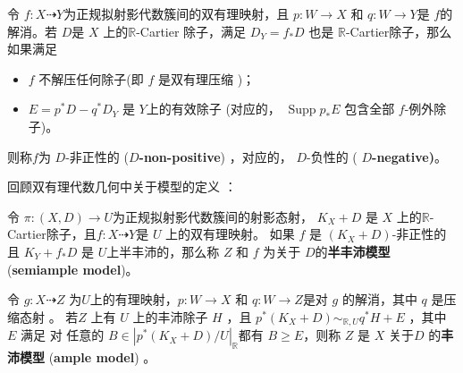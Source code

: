\begin{definition}\label{negativemap}
  \cite[Definition 3.6.1]{BCHM10}令 $f:X\dashrightarrow Y$为正规拟射影代数簇间的双有理映射，且 $p:W\to X$ 和 $q:W\to Y$是 $f$的解消。若 $D$是 $X$ 上的$\mathbb{R}$-Cartier 除子，满足  $D_{Y}=f_*D$ 也是 $\mathbb{R}$-Cartier除子，那么如果满足
  \begin{itemize}
    \item $f$ 不解压任何除子(即 $f$ 是双有理压缩 )；
    \item $E=p^{*}D-q^*D_Y$ 是  $Y$上的有效除子 (对应的， $\operatorname{Supp}p_*E$ 包含全部 $f$-例外除子)。
  \end{itemize}
 则称$f$为 $D$-非正性的  (\textbf{$D$-non-positive}) ，对应的， $D$-负性的 ( \textbf{$D$-negative)}。
\end{definition}

回顾双有理代数几何中关于模型的定义 \cite{BCHM10}：
\begin{definition}
  \cite[Definition 3.6.5]{BCHM10} 令 $ \pi:(X,D)\to U $为正规拟射影代数簇间的射影态射， $K_{X}+D$ 是 $X$ 上的$\mathbb{R}$-Cartier除子，且$ f: X\dashrightarrow Y $是 $U$ 上的双有理映射。  如果 $ f $ 是 $ (K_X+D) $-非正性的且 $ K_Y+f_*D $ 是 $ U $上半丰沛的，那么称 $Z$ 和 $f$ 为关于 $D$的\textbf{半丰沛模型}(\textbf{semiample model})。

  令 $ g:X\dashrightarrow Z $ 为$ U $上的有理映射，$p:W \to X $ 和 $q:W \to Z $是对 $g$ 的解消，其中 $q$ 是压缩态射 。 若$Z$ 上有 $U$ 上的丰沛除子 $H$ ，且 $p^*(K_{X}+D) \sim_{\mathbb{R},U} q^*H+E$ ，其中 $E$  满足    对 任意的 $B \in |p^*(K_{X}+D)/U|_{\mathbb{R}}$都有 $B\geqslant E$，则称 $Z$ 是 $X$ 关于$D$ 的\textbf{丰沛模型} (\textbf{ample model}) 。
\end{definition}

